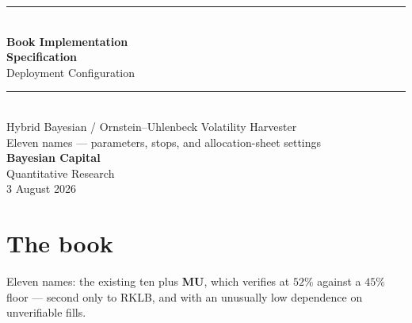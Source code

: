 \documentclass[11pt]{article}
\begin{document}
\begin{titlepage}
\vspace*{1.2cm}
{\color{bcgold}\rule{\textwidth}{2pt}}\\[0.4cm]
{\color{bcnavy}\Huge\bfseries Book Implementation}\\[0.25cm]
{\color{bcnavy}\Huge\bfseries Specification}\\[0.35cm]
{\color{bcblue}\LARGE Deployment Configuration}\\[0.5cm]
{\color{bcgold}\rule{\textwidth}{1pt}}\\[0.6cm]
{\large\color{bcgrey} Hybrid Bayesian / Ornstein--Uhlenbeck Volatility Harvester}\\[0.2cm]
{\large\color{bcgrey} Eleven names --- parameters, stops, and allocation-sheet settings}\\[1.2cm]
{\color{bcnavy}\large\bfseries Bayesian Capital}\\[0.15cm]
{\color{bcgrey} Quantitative Research}\\[0.15cm]
{\color{bcgrey} 3 August 2026}\\[1.8cm]

\end{titlepage}

\section{The book}

Eleven names: the existing ten plus \textbf{MU}, which verifies at $52\%$ against a $45\%$
floor --- second only to RKLB, and with an unusually low dependence on unverifiable fills.
\end{document}
